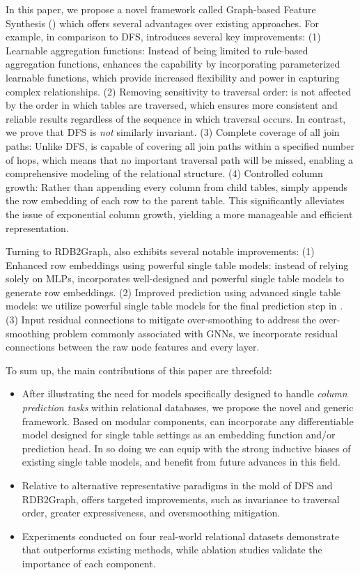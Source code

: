 In this paper, we propose a novel framework called Graph-based Feature Synthesis (\model{}) which offers several advantages over existing approaches.  For example, in comparison to DFS, \model{}  introduces several key improvements:
(1) Learnable aggregation functions: Instead of being limited to rule-based aggregation functions, \model{} enhances the capability by incorporating parameterized learnable functions, which provide increased flexibility and power in capturing complex relationships.
(2) Removing sensitivity to traversal order: \model{} is not affected by the order in which tables are traversed, which ensures more consistent and reliable results regardless of the sequence in which traversal occurs.  In contrast, we prove that DFS is \textit{not} similarly invariant.
(3) Complete coverage of all join paths: Unlike DFS, \model{} is capable of covering all join paths within a specified number of hops, which means that no important traversal path will be missed, enabling a comprehensive modeling of the relational structure. 
(4) Controlled column growth: Rather than appending every column from child tables, \model{} simply appends the row embedding of each row to the parent table. This significantly alleviates the issue of exponential column growth, yielding a more manageable and efficient representation.

Turning to RDB2Graph, \model{} also exhibits several notable improvements:
(1) Enhanced row embeddings using powerful single table models: instead of relying solely on MLPs, \model{} incorporates well-designed and powerful single table models to generate row embeddings. %
(2) Improved prediction using advanced single table models: we utilize powerful single table models for the final prediction step in \model{}. %
(3) Input residual connections to mitigate over-smoothing \cite{alon2020oversquashing,chen2020oversmoothing} to address the over-smoothing problem commonly associated with GNNs, we incorporate residual connections between the raw node features and every layer. %

To sum up, the main contributions of this paper are threefold:
\begin{itemize}[leftmargin=*]
    \item After illustrating the need for models specifically designed to handle \emph{column prediction tasks} within relational databases, we propose the novel and generic \model{} framework. Based on modular components, \model{} can incorporate any
    differentiable model designed for single table settings as an embedding function and/or prediction head.  In so doing we can equip \model{} with the strong inductive biases of existing single table models, and benefit from future advances in this field.
    \item Relative to alternative representative paradigms in the mold of DFS and RDB2Graph, \model{} offers targeted improvements, such as invariance to traversal order, greater expressiveness, and oversmoothing mitigation.
    \item Experiments conducted on four real-world relational datasets demonstrate that \model{} outperforms existing methods, while ablation studies validate the importance of each \model{} component.
\end{itemize}


